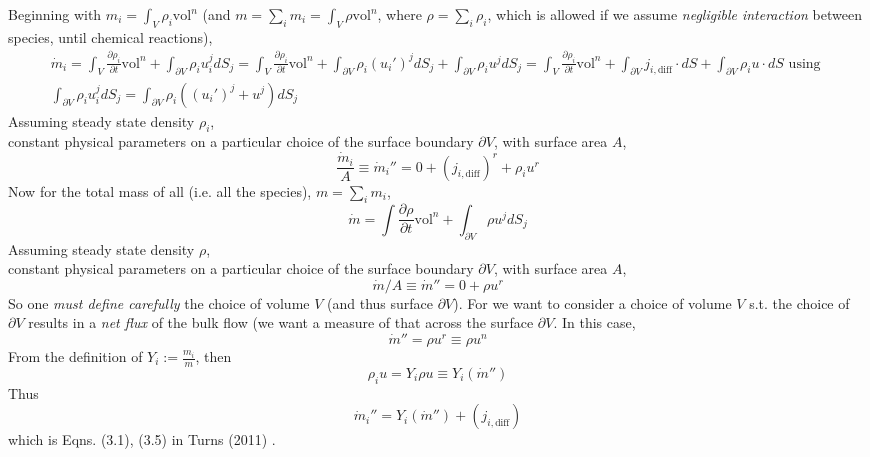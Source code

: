 \documentclass[10pt]{amsart}
\begin{document}
\begin{multicols*}{2}
Beginning with $m_i = \int_V \rho_i \text{vol}^n$ (and $m = \sum_i m_i = \int_V \rho \text{vol}^n$, where $\rho = \sum_i \rho_i$, which is allowed if we assume \emph{negligible interaction} between species, until chemical reactions), 
\[
\begin{gathered}
  \dot{m}_i = \int_V \frac{ \partial \rho_i}{ \partial t} \text{vol}^n + \int_{\partial V} \rho_i u_i^j dS_j = \int_V \frac{ \partial \rho_i }{ \partial t} \text{vol}^n + \int_{\partial V} \rho_i(u_i')^j dS_j + \int_{\partial V} \rho_i u^j dS_j = \int_V \frac{ \partial \rho_i}{ \partial t} \text{vol}^n + \int_{\partial V} j_{i,\text{diff}} \cdot dS + \int_{\partial V} \rho_i u \cdot dS \text{ using } \\
  \int_{ \partial V} \rho_i u_i^j dS_j = \int_{\partial V} \rho_i((u_i')^j + u^j)dS_j 
\end{gathered}
\]
Assuming steady state density $\rho_i$, \\
\phantom{Assuming } constant physical parameters on a particular choice of the surface boundary $\partial V$, with surface area $A$, 
\[
\frac{\dot{m}_i}{A} \equiv \dot{m}_i'' = 0 + (j_{i,\text{diff}})^r + \rho_i u^r
\]
Now for the total mass of all (i.e. all the species), $m = \sum_i m_i$, 
\[
\dot{m} = \int \frac{ \partial \rho }{ \partial t} \text{vol}^n + \int_{\partial V} \rho u^j dS_j
\]
Assuming steady state density $\rho$, \\
\phantom{Assuming } constant physical parameters on a particular choice of the surface boundary $\partial V$, with surface area $A$,
\[
\dot{m}/A \equiv \dot{m}'' = 0 + \rho u^r
\]
So one \emph{must define carefully} the choice of volume $V$ (and thus surface $\partial V$).  For we want to consider a choice of volume $V$ s.t. the choice of $\partial V$ results in a \emph{net flux} of the bulk flow (we want a measure of that across the surface $\partial V$.  In this case,
\[
\dot{m}'' = \rho u^r \equiv \rho u^n
\]
From the definition of $Y_i := \frac{m_i}{m}$, then 
\[
\rho_i u = Y_i \rho u \equiv Y_i (\dot{m}'')
\]
Thus
\begin{equation}
  \dot{m}_i'' = Y_i(\dot{m}'') + (j_{i,\text{diff}}) 
\end{equation}
which is Eqns. (3.1), (3.5) in Turns (2011) \cite{STurns2011}.  



\end{multicols*}
\end{document}
